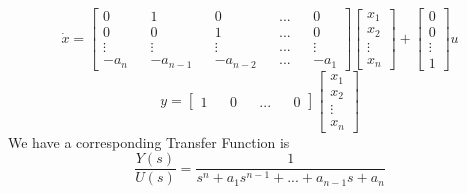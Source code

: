 \documentclass[12pt,a4paper]{article}
\begin{document}
	\[
	\dot{x} = 
	\begin{bmatrix}
		0      &   & 1        &   & 0        &   & ... &   & 0      \\
		0      &   & 0        &   & 1        &   & ... &   & 0      \\
		\vdots &   & \vdots   &   & \vdots   &   & ... &   & \vdots \\
		-a_n   &   & -a_{n-1} &   & -a_{n-2} &   & ... &   & -a_1   
	\end{bmatrix}
	\begin{bmatrix}
		x_1    \\
		x_2    \\
		\vdots \\
		x_n    
	\end{bmatrix} +
	\begin{bmatrix}
		0      \\
		0      \\
		\vdots \\
		1      
	\end{bmatrix} u
	\]
	\[
	y =
	\begin{bmatrix}
		1 &   & 0 &   & ... &   & 0 
	\end{bmatrix}
	\begin{bmatrix}
		x_1    \\
		x_2    \\
		\vdots \\
		x_n    
	\end{bmatrix}
	\]
	We have a corresponding Transfer Function is 
	\[\frac{Y(s)}{U(s)} = \frac{1}{s^n+a_1s^{n-1}+...+a_{n-1}s+a_n}\]
	
\end{document}
